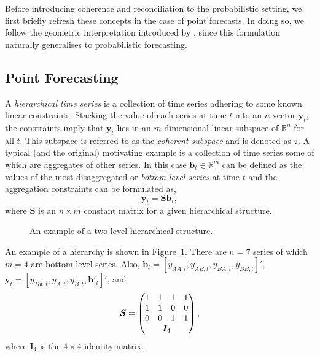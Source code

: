 \documentclass[12pt]{article}
\theoremstyle{definition}
\begin{document}
Before introducing coherence and reconciliation to the probabilistic setting, we first briefly refresh these concepts in the case of point forecasts.  In doing so, we follow the geometric interpretation introduced by \cite{PanEtAl2019HF}, since this formulation naturally generalises to probabilistic forecasting.


\subsection{Point Forecasting}\label{sec:PointForecasts}

A \emph{hierarchical time series} is a collection of time series adhering to some known linear constraints.  Stacking the value of each series at time $t$ into an $n$-vector ${\bm y}_t$, the constraints imply that ${\bm y}_t$ lies in an $m$-dimensional linear subspace of $\mathbb{R}^n$ for all $t$.  This subspace is referred to as the {\em coherent subspace} and is denoted as $\mathfrak{s}$.  A typical (and the original) motivating example is a collection of time series some of which are aggregates of other series. In this case $\bm{b}_t \in \mathbb{R}^m$ can be defined as the values of the most disaggregated or \emph{bottom-level series} at time $t$ and the aggregation constraints can be formulated as,
\begin{equation*}
\bm{y}_t = \bm{Sb}_t,
\end{equation*}
where $\bm{S}$ is an $n \times m$ constant matrix for a given hierarchical structure.

\begin{figure}[H]
	\begin{center}
		 
		 
		\qobitree
	\end{center}
	\caption{An example of a two level hierarchical structure.}\label{fig:twoL-hier}
\end{figure}
An example of a hierarchy is shown in Figure~\ref{fig:twoL-hier}. There are $n=7$ series of which $m=4$ are bottom-level series. Also, $\bm{b}_t = [y_{AA,t}, y_{AB,t}, y_{BA,t}, y_{BB,t}]'$, $\bm{y}_t = [y_{Tot,t},y_{A,t}, y_{B,t},\bm{b}'_t]'$,  and
\[
\bm{S} = \begin{pmatrix}
1 & 1 & 1 & 1 \\
1 & 1 & 0 & 0 \\
0 & 0 & 1 & 1 \\
& \multicolumn{2}{c}{\bm{I}_4} &
\end{pmatrix},
\]
where $\bm{I}_4$ is the $4\times 4$ identity matrix.
\end{document}
